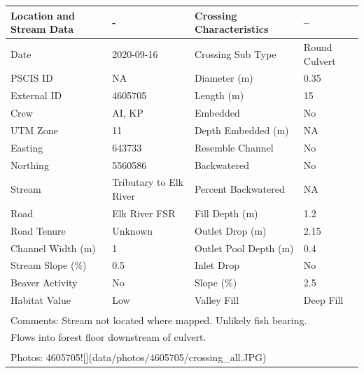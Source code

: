 \documentclass[
]{book}
\begin{document}
\begin{tabular}{llll}
\toprule
Location and Stream Data & - & Crossing Characteristics & --\\
\midrule
Date & 2020-09-16 & Crossing Sub Type & Round Culvert\\
PSCIS ID & NA & Diameter (m) & 0.35\\
External ID & 4605705 & Length (m) & 15\\
Crew & AI, KP & Embedded & No\\
UTM Zone & 11 & Depth Embedded (m) & NA\\
\addlinespace
Easting & 643733 & Resemble Channel & No\\
Northing & 5560586 & Backwatered & No\\
Stream & Tributary to Elk River & Percent Backwatered & NA\\
Road & Elk River FSR & Fill Depth (m) & 1.2\\
Road Tenure & Unknown & Outlet Drop (m) & 2.15\\
\addlinespace
Channel Width (m) & 1 & Outlet Pool Depth (m) & 0.4\\
Stream Slope (\%) & 0.5 & Inlet Drop & No\\
Beaver Activity & No & Slope (\%) & 2.5\\
Habitat Value & Low & Valley Fill & Deep Fill\\
\bottomrule
\multicolumn{4}{l}{\textsuperscript{} Comments: Stream not located where mapped. Unlikely fish bearing.}\\
\multicolumn{4}{l}{Flows into forest floor downstream of culvert.}\\
\multicolumn{4}{l}{\textsuperscript{} Photos: 4605705![](data/photos/4605705/crossing\_all.JPG)}\\
\end{tabular}
\end{document}
